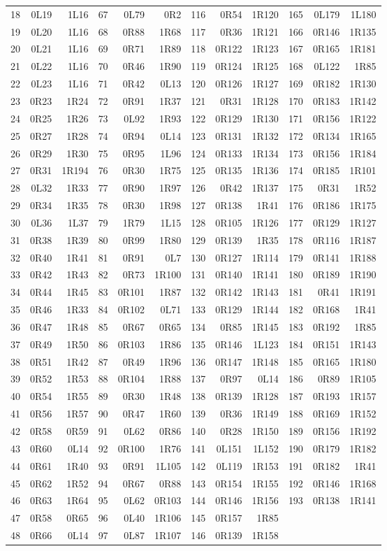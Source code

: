 \begin{center}
\begin{tabular}{rrr@{\hspace{12pt}}rrr@{\hspace{12pt}}rrr@{\hspace{12pt}}rrr}
18&0L19&1L16&67&0L79&0R2&116&0R54&1R120&165&0L179&1L180\\
19&0L20&1L16&68&0R88&1R68&117&0R36&1R121&166&0R146&1R135\\
20&0L21&1L16&69&0R71&1R89&118&0R122&1R123&167&0R165&1R181\\
21&0L22&1L16&70&0R46&1R90&119&0R124&1R125&168&0L122&1R85\\
22&0L23&1L16&71&0R42&0L13&120&0R126&1R127&169&0R182&1R130\\
23&0R23&1R24&72&0R91&1R37&121&0R31&1R128&170&0R183&1R142\\
24&0R25&1R26&73&0L92&1R93&122&0R129&1R130&171&0R156&1R122\\
25&0R27&1R28&74&0R94&0L14&123&0R131&1R132&172&0R134&1R165\\
26&0R29&1R30&75&0R95&1L96&124&0R133&1R134&173&0R156&1R184\\
27&0R31&1R194&76&0R30&1R75&125&0R135&1R136&174&0R185&1R101\\
28&0L32&1R33&77&0R90&1R97&126&0R42&1R137&175&0R31&1R52\\
29&0R34&1R35&78&0R30&1R98&127&0R138&1R41&176&0R186&1R175\\
30&0L36&1L37&79&1R79&1L15&128&0R105&1R126&177&0R129&1R127\\
31&0R38&1R39&80&0R99&1R80&129&0R139&1R35&178&0R116&1R187\\
32&0R40&1R41&81&0R91&0L7&130&0R127&1R114&179&0R141&1R188\\
33&0R42&1R43&82&0R73&1R100&131&0R140&1R141&180&0R189&1R190\\
34&0R44&1R45&83&0R101&1R87&132&0R142&1R143&181&0R41&1R191\\
35&0R46&1R33&84&0R102&0L71&133&0R129&1R144&182&0R168&1R41\\
36&0R47&1R48&85&0R67&0R65&134&0R85&1R145&183&0R192&1R85\\
37&0R49&1R50&86&0R103&1R86&135&0R146&1L123&184&0R151&1R143\\
38&0R51&1R42&87&0R49&1R96&136&0R147&1R148&185&0R165&1R180\\
39&0R52&1R53&88&0R104&1R88&137&0R97&0L14&186&0R89&1R105\\
40&0R54&1R55&89&0R30&1R48&138&0R139&1R128&187&0R193&1R157\\
41&0R56&1R57&90&0R47&1R60&139&0R36&1R149&188&0R169&1R152\\
42&0R58&0R59&91&0L62&0R86&140&0R28&1R150&189&0R156&1R192\\
43&0R60&0L14&92&0R100&1R76&141&0L151&1L152&190&0R179&1R182\\
44&0R61&1R40&93&0R91&1L105&142&0L119&1R153&191&0R182&1R41\\
45&0R62&1R52&94&0R67&0R88&143&0R154&1R155&192&0R146&1R168\\
46&0R63&1R64&95&0L62&0R103&144&0R146&1R156&193&0R138&1R141\\
47&0R58&0R65&96&0L40&1R106&145&0R157&1R85&&&\\
48&0R66&0L14&97&0L87&1R107&146&0R139&1R158&&&\\
\bottomrule
\end{tabular}
\end{center}
